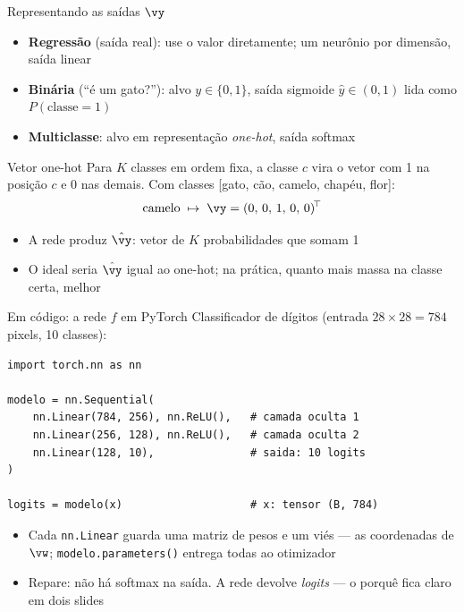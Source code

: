 \documentclass[aspectratio=169, 11pt]{beamer}
\begin{document}
\begin{frame}{Representando as saídas $\vy$}
  \begin{itemize}\setlength{\itemsep}{0.4ex}
    \item \textbf{Regressão} (saída real): use o valor diretamente; um neurônio
          por dimensão, saída linear
    \item \textbf{Binária} (``é um gato?''): alvo $y \in \{0, 1\}$, saída
          sigmoide $\hat{y} \in (0,1)$ lida como $P(\text{classe} = 1)$
    \item \textbf{Multiclasse}: alvo em representação \emph{one-hot}, saída softmax
  \end{itemize}

  \begin{defbox}{Vetor one-hot}
    Para $K$ classes em ordem fixa, a classe $c$ vira o vetor com 1 na posição
    $c$ e 0 nas demais. Com classes [gato, cão, camelo, chapéu, flor]:
    \[
      \text{camelo} \;\mapsto\; \vy = (0,\, 0,\, 1,\, 0,\, 0)^{\!\top}
    \]
  \end{defbox}

  \begin{itemize}\setlength{\itemsep}{0.2ex}
    \item A rede produz $\hat{\vy}$: vetor de $K$ probabilidades que somam 1
    \item O ideal seria $\hat{\vy}$ igual ao one-hot; na prática, quanto mais massa
          na classe certa, melhor
  \end{itemize}
\end{frame}

\begin{frame}[fragile]{Em código: a rede $f$ em PyTorch}
  Classificador de dígitos (entrada $28 \times 28 = 784$ pixels, 10 classes):

\begin{lstlisting}
import torch.nn as nn

modelo = nn.Sequential(
    nn.Linear(784, 256), nn.ReLU(),   # camada oculta 1
    nn.Linear(256, 128), nn.ReLU(),   # camada oculta 2
    nn.Linear(128, 10),               # saida: 10 logits
)

logits = modelo(x)                    # x: tensor (B, 784)
\end{lstlisting}

  \begin{itemize}\setlength{\itemsep}{0.2ex}
    \item Cada \texttt{nn.Linear} guarda uma matriz de pesos e um viés — as
          coordenadas de $\vw$; \texttt{modelo.parameters()} entrega todas ao otimizador
    \item Repare: \alert{não há softmax na saída}. A rede devolve \emph{logits} —
          o porquê fica claro em dois slides
  \end{itemize}
\end{frame}
\end{document}

